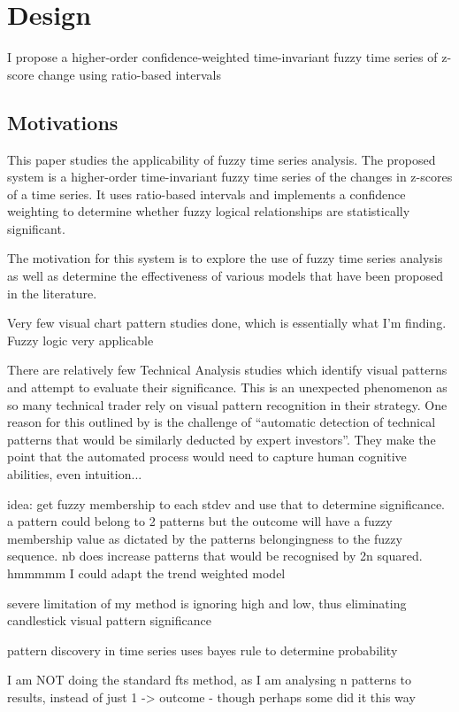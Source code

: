 \documentclass{article}
\theoremstyle{definition}
\begin{document}
\section{Design}

I propose a higher-order confidence-weighted time-invariant fuzzy time series of z-score change using ratio-based intervals 

\subsection{Motivations}

This paper studies the applicability of fuzzy time series analysis. The proposed system is a higher-order time-invariant fuzzy time series of the changes in z-scores of a time series. It uses ratio-based intervals and implements a confidence weighting to determine whether fuzzy logical relationships are statistically significant. 

The motivation for this system is to explore the use of fuzzy time series analysis as well as determine the effectiveness of various models that have been proposed in the literature.

Very few visual chart pattern studies done, which is essentially what I'm finding. Fuzzy logic very applicable

There are relatively few Technical Analysis studies which identify visual patterns and attempt to evaluate their significance. This is an unexpected phenomenon as so many technical trader rely on visual pattern recognition in their strategy. One reason for this outlined by \cite{2020} is the challenge of ``automatic detection of technical patterns that would be similarly deducted by expert investors''. They make the point that the automated process would need to capture human cognitive abilities, even intuition...

idea: get fuzzy membership to each stdev and use that to determine significance. a pattern could belong to 2 patterns but the outcome will have a fuzzy membership value as dictated by the patterns belongingness to the fuzzy sequence. nb does increase patterns that would be recognised by 2n squared.
hmmmmm I could adapt the trend weighted model

severe limitation of my method is ignoring high and low, thus eliminating candlestick visual pattern significance

pattern discovery in time series uses bayes rule to determine probability

I am NOT doing the standard fts method, as I am analysing n patterns to results, instead of just 1 -> outcome - though perhaps some did it this way
\end{document}

